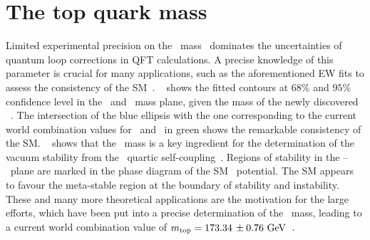 \section{The top quark mass}
%
Limited experimental precision on the \tquark\ mass \mt\ dominates the uncertainties of quantum loop corrections in \gls{QFT} calculations.
%
A precise knowledge of this parameter is crucial for many applications, such as the aforementioned \gls{EW} fits to assess the consistency of the \gls{SM}~\cite{Baak2014}. \Fig~ shows the fitted contours at $68\%$ and $95\%$ confidence level in the \tquark\ and \Wboson\ mass plane, given the mass of the newly discovered \Hboson\ \mH. The intersection of the blue ellipsis with the one corresponding to the current world combination values for \mt\ and \mW\ in green shows the remarkable consistency of the \gls{SM}.
%
\Fig~ shows that the \tquark\ mass is a key ingredient for the determination of the vacuum stability from the \Hboson\ quartic self-coupling~\cite{Degrassi2012}. Regions of stability in the \mt--\mH\ plane are marked in the phase diagram of the \gls{SM} \Hboson\ potential. The \gls{SM} appears to favour the meta-stable region at the boundary of stability and instability.
%
These and many more theoretical applications are the motivation for the large efforts, which have been put into a precise determination of the \tquark\ mass, leading to a current world combination value of $m_{\mathrm{top}} = 173.34\,\pm 0.76~\mathrm{GeV}$~\cite{ATLAS:2014wva}.
%
